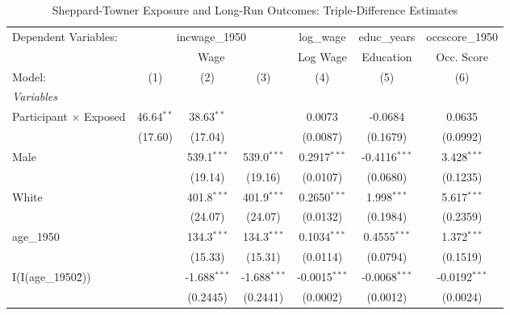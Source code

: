 
\begin{table}[htbp]
   \caption{\label{tab:main} Sheppard-Towner Exposure and Long-Run Outcomes: Triple-Difference Estimates}
   \centering
   \begin{adjustbox}{max width=\textwidth}
   \begin{tabular}{lcccccc}
      \tabularnewline \midrule \midrule
      Dependent Variables: & \multicolumn{3}{c}{incwage\_1950} & log\_wage & educ\_years & occscore\_1950\\
       & \multicolumn{3}{c}{Wage} & Log Wage & Education & Occ. Score \\ 
      Model:                        & (1)          & (2)            & (3)            & (4)             & (5)             & (6)\\  
      \midrule
      \emph{Variables}\\
      Participant $\times$ Exposed  & 46.64$^{**}$ & 38.63$^{**}$   &                & 0.0073          & -0.0684         & 0.0635\\   
                                    & (17.60)      & (17.04)        &                & (0.0087)        & (0.1679)        & (0.0992)\\   
      Male                          &              & 539.1$^{***}$  & 539.0$^{***}$  & 0.2917$^{***}$  & -0.4116$^{***}$ & 3.428$^{***}$\\   
                                    &              & (19.14)        & (19.16)        & (0.0107)        & (0.0680)        & (0.1235)\\   
      White                         &              & 401.8$^{***}$  & 401.9$^{***}$  & 0.2650$^{***}$  & 1.998$^{***}$   & 5.617$^{***}$\\   
                                    &              & (24.07)        & (24.07)        & (0.0132)        & (0.1984)        & (0.2359)\\   
      age\_1950                     &              & 134.3$^{***}$  & 134.3$^{***}$  & 0.1034$^{***}$  & 0.4555$^{***}$  & 1.372$^{***}$\\   
                                    &              & (15.33)        & (15.31)        & (0.0114)        & (0.0794)        & (0.1519)\\   
      I(I(age\_1950\^2))            &              & -1.688$^{***}$ & -1.688$^{***}$ & -0.0015$^{***}$ & -0.0068$^{***}$ & -0.0192$^{***}$\\   
                                    &              & (0.2445)       & (0.2441)       & (0.0002)        & (0.0012)        & (0.0024)\\   

\end{tabular}
\end{adjustbox}
\end{table}
